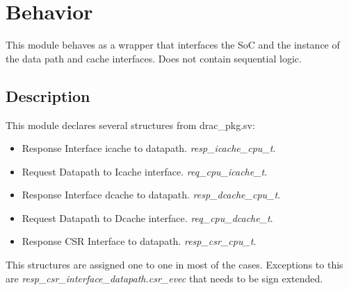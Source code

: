 \section{Behavior}

This module behaves as a wrapper that interfaces the SoC and the instance of the data path and cache interfaces. Does not contain sequential logic. 

\subsection{Description}

This module declares several structures from drac\_pkg.sv:

\begin{itemize}
	\item Response Interface icache to datapath. \emph{resp\_icache\_cpu\_t}. 
	\item Request Datapath to Icache interface. \emph{req\_cpu\_icache\_t}. 
	\item Response Interface dcache to datapath. \emph{resp\_dcache\_cpu\_t}. 
	\item Request Datapath to Dcache interface. \emph{req\_cpu\_dcache\_t}. 
	\item  Response CSR Interface to datapath. \emph{resp\_csr\_cpu\_t}. 
\end{itemize}

This structures are assigned one to one in most of the cases. Exceptions to this are \emph{resp\_csr\_interface\_datapath.csr\_evec} that needs to be sign extended. 

